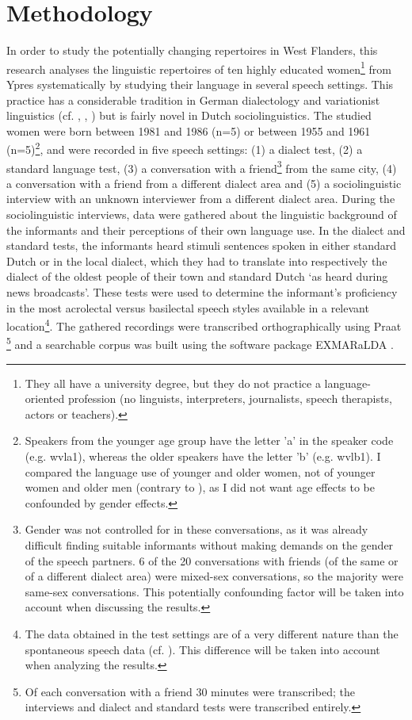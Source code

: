 \documentclass[output=paper]{LSP/langsci}
\begin{document}
\section{Methodology}

In order to study the potentially changing repertoires in West Flanders, this research analyses the linguistic repertoires of ten highly educated women\footnote{They all have a university degree, but they do not practice a language-oriented profession (no linguists, interpreters, journalists, speech therapists, actors or teachers).} from Ypres systematically by studying their language in several speech settings. This practice has a considerable tradition in German dialectology and variationist linguistics (cf. \citealt{kehrein_regionalsprachliche_2012}, \citealt{lenz_struktur_2003}, \citealt{stellmacher_studien_1977}) but is fairly novel in Dutch sociolinguistics. The studied women were born between 1981 and 1986 (n=5) or between 1955 and 1961 (n=5)\footnote{ Speakers from the younger age group have the letter 'a' in the speaker code (e.g. wvla1), whereas the older speakers have the letter 'b' (e.g. wvlb1). I compared the language use of younger and older women, not of younger women and older men (contrary to \citealt{heeringa_convergence_2014}), as I did not want age effects to be confounded by gender effects. }, and were recorded in five speech settings: (1) a dialect test, (2) a standard language test, (3) a conversation with a friend\footnote{Gender was not controlled for in these conversations, as it was already difficult finding suitable informants without making demands on the gender of the speech partners. 6 of the 20 conversations with friends (of the same or of a different dialect area) were mixed-sex conversations, so the majority were same-sex conversations. This potentially confounding factor will be taken into account when discussing the results.} from the same city, (4) a conversation with a friend from a different dialect area and (5) a sociolinguistic interview with an unknown interviewer from a different dialect area. During the sociolinguistic interviews, data were gathered about the linguistic background of the informants and their perceptions of their own language use. In the dialect and standard tests, the informants heard stimuli sentences spoken in either standard Dutch or in the local dialect, which they had to translate into respectively the dialect of the oldest people of their town and standard Dutch ‘as heard during news broadcasts’. These tests were used to determine the informant’s proficiency in the most acrolectal versus basilectal speech styles available in a relevant location\footnote{ The data obtained in the test settings are of a very different nature than the spontaneous speech data (cf. \citealt[57--62]{lenz_struktur_2003}). This difference will be taken into account when analyzing the results.}. The gathered recordings were transcribed orthographically using Praat \citep{boersma_praat:_2011}\footnote{Of each conversation with a friend 30 minutes were transcribed; the interviews and dialect and standard tests were transcribed entirely.} and a searchable corpus was built using the software package EXMARaLDA \citep{schmidt_exmaralda_2009}.
\end{document}
